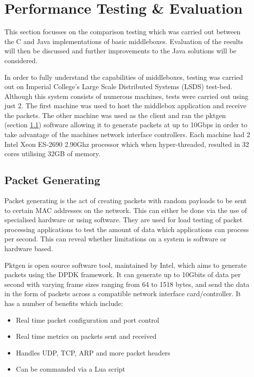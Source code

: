 \documentclass[final_report.tex]{subfiles}
\begin{document}
\section{Performance Testing \& Evaluation}
\label{sec:evaluation}

This section focusses on the comparison testing which was carried out between the C and Java implementations of basic middleboxes. Evaluation of the results will then be discussed and further improvements to the Java solutions will be considered.

In order to fully understand the capabilities of middleboxes, testing was carried out on Imperial College's Large Scale Distributed Systems (LSDS) test-bed. Although this system consists of numerous machines, tests were carried out using just 2. The first machine was used to host the middlebox application and receive the packets. The other machine was used as the client and ran the pktgen (section \ref{subsec:pktgen}) software allowing it to generate packets at up to 10Gbps in order to take advantage of the machines network interface controllers. Each machine had 2 Intel Xeon ES-2690 2.90Ghz processor which when hyper-threaded, resulted in 32 cores utilising 32GB of memory.

\subsection{Packet Generating}
\label{subsec:pktgen}
Packet generating is the act of creating packets with random payloads to be sent to certain MAC addresses on the network. This can either be done via the use of specialised hardware or using software. They are used for load testing of packet processing applications to test the amount of data which applications can process per second. This can reveal whether limitations on a system is software or hardware based.


Pktgen is open source software tool, maintained by Intel, which aims to generate packets using the DPDK framework. It can generate up to 10Gbits of data per second with varying frame sizes ranging from 64 to 1518 bytes, and send the data in the form of packets across a compatible network interface card/controller. It has a number of benefits which include:

\begin{itemize}
	\item Real time packet configuration and port control
	\item Real time metrics on packets sent and received
	\item Handles UDP, TCP, ARP and more packet headers
	\item Can be commanded via a Lua script
\end{itemize}
\end{document}
